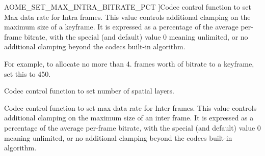 \begin{Desc}
\begin{description}
{A\+O\+M\+E\+\_\+\+S\+E\+T\+\_\+\+M\+A\+X\+\_\+\+I\+N\+T\+R\+A\+\_\+\+B\+I\+T\+R\+A\+T\+E\+\_\+\+P\+CT\hypertarget{group__aom__encoder_ggae78dde67a6d78f332e9bdba0dde42db5a9e1965ffa40d2d87556b65748c63adcc}{}\label{group__aom__encoder_ggae78dde67a6d78f332e9bdba0dde42db5a9e1965ffa40d2d87556b65748c63adcc}
}]Codec control function to set Max data rate for Intra frames. This value controls additional clamping on the maximum size of a keyframe. It is expressed as a percentage of the average per-\/frame bitrate, with the special (and default) value 0 meaning unlimited, or no additional clamping beyond the codec\textquotesingle{}s built-\/in algorithm.

For example, to allocate no more than 4. frames worth of bitrate to a keyframe, set this to 450. \item[{\em 
A\+O\+M\+E\+\_\+\+S\+E\+T\+\_\+\+N\+U\+M\+B\+E\+R\+\_\+\+S\+P\+A\+T\+I\+A\+L\+\_\+\+L\+A\+Y\+E\+RS\hypertarget{group__aom__encoder_ggae78dde67a6d78f332e9bdba0dde42db5aef4facbd3745aa7f2a604faaf68316ff}{}\label{group__aom__encoder_ggae78dde67a6d78f332e9bdba0dde42db5aef4facbd3745aa7f2a604faaf68316ff}
}]Codec control function to set number of spatial layers. \item[{\em 
A\+V1\+E\+\_\+\+S\+E\+T\+\_\+\+M\+A\+X\+\_\+\+I\+N\+T\+E\+R\+\_\+\+B\+I\+T\+R\+A\+T\+E\+\_\+\+P\+CT\hypertarget{group__aom__encoder_ggae78dde67a6d78f332e9bdba0dde42db5a54b7c950e51f39a3cb7344a2665b9929}{}\label{group__aom__encoder_ggae78dde67a6d78f332e9bdba0dde42db5a54b7c950e51f39a3cb7344a2665b9929}
}]Codec control function to set max data rate for Inter frames. This value controls additional clamping on the maximum size of an inter frame. It is expressed as a percentage of the average per-\/frame bitrate, with the special (and default) value 0 meaning unlimited, or no additional clamping beyond the codec\textquotesingle{}s built-\/in algorithm.


\end{description}
\end{Desc}
